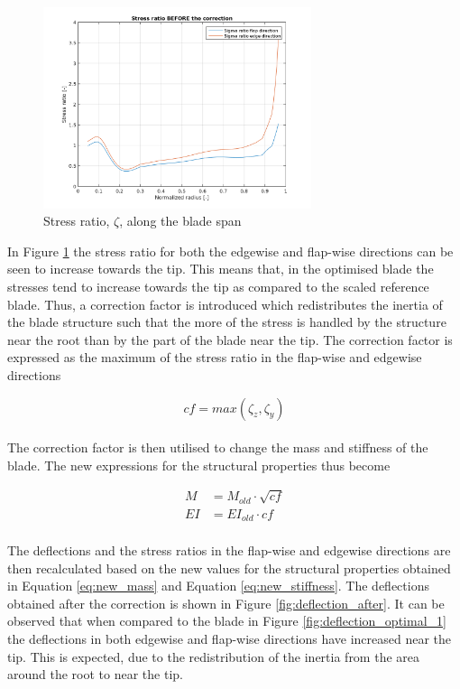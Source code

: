 \begin{figure}[H]
\centering
\includegraphics[width=0.7\textwidth]{Images/sigma_ratio_before.png} 
\caption{Stress ratio, $\zeta$, along the blade span  }\label{fig:stress_ratio_before}
\end{figure}

In Figure \ref{fig:stress_ratio_before} the stress ratio for both the edgewise and flap-wise directions can be seen to increase towards the tip. This means that, in the optimised blade the stresses tend to increase towards the tip as compared to the scaled reference blade. Thus, a correction factor is introduced which redistributes the inertia of the blade structure such that the more of the stress is handled by the structure near the root than by the part of the blade near the tip. The correction factor is expressed as the maximum of the stress ratio in the flap-wise and edgewise directions

\begin{equation}
     cf = max(\zeta_{z},\zeta_{y})
\label{eq:correction_factor}
\end{equation}
\\
The correction factor is then utilised to change the mass and stiffness of the blade. The new expressions for the structural properties thus become

\begin{align}
     M  &= M_{old} \cdot \sqrt{cf} \label{eq:new_mass} \\
     EI &= EI_{old} \cdot cf \label{eq:new_stiffness}
\end{align}
\\
The deflections and the stress ratios in the flap-wise and edgewise directions are then recalculated based on the new values for the structural properties obtained in Equation \ref{eq:new_mass} and Equation \ref{eq:new_stiffness}. The deflections obtained after the correction is shown in Figure \ref{fig:deflection_after}. It can be observed that when compared to the blade in Figure \ref{fig:deflection_optimal_1} the deflections in both edgewise and flap-wise directions have  increased near the tip. This is expected, due to the redistribution of the inertia from the area around the root to near the tip.

